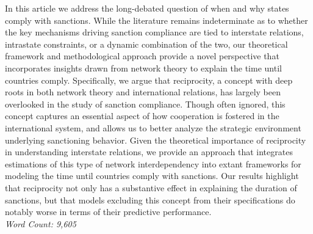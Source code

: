 In this article we address the long-debated question of when and why states comply with sanctions. While the literature remains indeterminate as to whether the key mechanisms driving sanction compliance are tied to interstate relations, intrastate constraints, or a dynamic combination of the two, our theoretical framework and methodological approach provide a novel perspective that incorporates insights drawn from network theory to explain the time until countries comply. Specifically, we argue that reciprocity, a concept with deep roots in both network theory and international relations, has largely been overlooked in the study of sanction compliance. Though often ignored, this concept captures an essential aspect of how cooperation is fostered in the international system, and allows us to better analyze the strategic environment underlying sanctioning behavior. Given the theoretical importance of reciprocity in understanding interstate relations, we provide an approach that integrates estimations of this type of network interdependency into extant frameworks for modeling the time until countries comply with sanctions. Our results highlight that reciprocity not only has a substantive effect in explaining the duration of sanctions, but that models excluding this concept from their specifications do notably worse in terms of their predictive performance.\\

\noindent \textit{Word Count: 9,605}